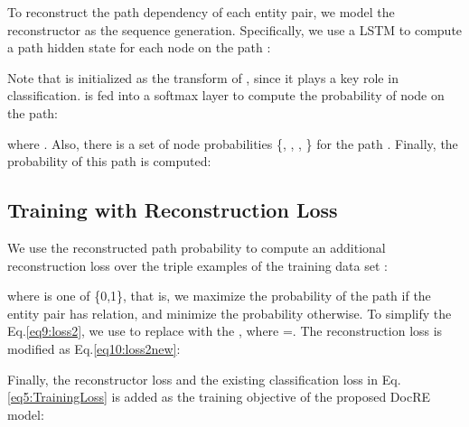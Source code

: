 \documentclass[letterpaper]{article} \usepackage{aaai21}  \usepackage{times}  \usepackage{helvet} \usepackage{courier}  \usepackage[hyphens]{url}  \usepackage{graphicx} \urlstyle{rm} \def\UrlFont{\rm}  \usepackage{natbib}  \usepackage{caption} \frenchspacing  \setlength{\pdfpagewidth}{8.5in}  \setlength{\pdfpageheight}{11in}  \usepackage{amsmath}
\begin{document}
To reconstruct the path dependency of each entity pair, we model the reconstructor as the sequence generation.
Specifically, we use a LSTM to compute a path hidden state  for each node  on the path :

Note that  is initialized as the transform of , since it plays a key role in classification.
 is fed into a softmax layer to compute the probability of node  on the path:

where . 
Also, there is a set of node probabilities  \{, , , \} for the path .
Finally, the probability of this path  is computed:


\subsection{Training with Reconstruction Loss}



We use the reconstructed path probability to compute an additional reconstruction loss over the triple examples of the training data set :

where  is one of \{0,1\}, that is, we maximize the probability of the path  if the entity pair has relation, and minimize the probability otherwise.
To simplify the Eq.\eqref{eq9:loss2}, we use  to replace with the , where =. 
The reconstruction loss is modified as Eq.\eqref{eq10:loss2new}:

Finally, the reconstructor loss and the existing classification loss in Eq.\eqref{eq5:TrainingLoss} is added as the training objective of the proposed DocRE model:
\end{document}
